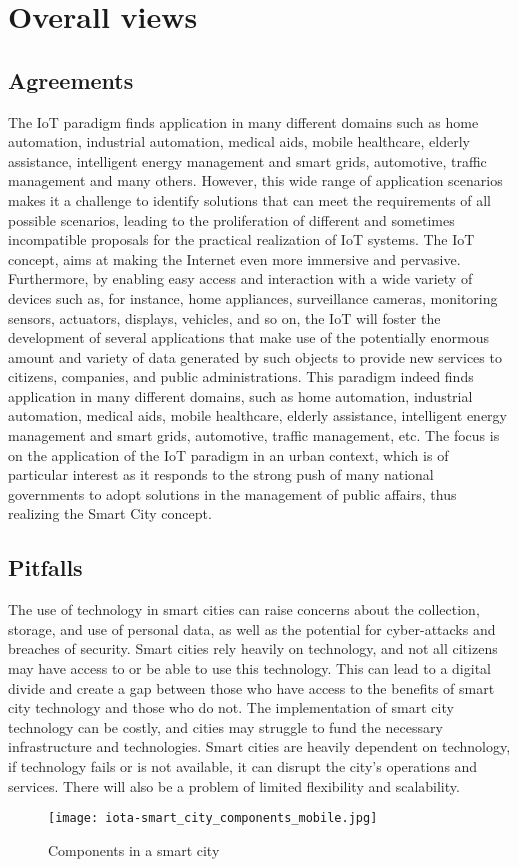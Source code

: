 \documentclass{article}
\begin{document}
 \section{Overall views}
\subsection{Agreements}
The IoT paradigm finds application in many different domains such as home automation, industrial automation, medical aids, mobile healthcare, elderly assistance, intelligent energy management and smart grids, automotive, traffic management and many others. However, this wide range of application scenarios makes it a challenge to identify solutions that can meet the requirements of all possible scenarios, leading to the proliferation of different and sometimes incompatible proposals for the practical realization of IoT systems.
The IoT concept, aims at making the Internet even more immersive and pervasive. Furthermore, by enabling easy access and interaction with a wide variety of devices such as, for instance, home appliances, surveillance cameras, monitoring sensors, actuators, displays, vehicles, and so on, the IoT will foster the development of several applications that make use of the potentially enormous amount and variety of data generated by such objects to provide new services to citizens, companies, and public administrations. This paradigm indeed finds application in many different domains, such as home automation, industrial automation, medical aids, mobile healthcare, elderly assistance, intelligent energy management and smart grids, automotive, traffic management, etc. The focus is on the application of the IoT paradigm in an urban context, which is of particular interest as it responds to the strong push of many national governments to adopt solutions in the management of public affairs, thus realizing the Smart City concept.
\subsection{Pitfalls}
The use of technology in smart cities can raise concerns about the collection, storage, and use of personal data, as well as the potential for cyber-attacks and breaches of security.
Smart cities rely heavily on technology, and not all citizens may have access to or be able to use this technology. This can lead to a digital divide and create a gap between those who have access to the benefits of smart city technology and those who do not.
The implementation of smart city technology can be costly, and cities may struggle to fund the necessary infrastructure and technologies.
Smart cities are heavily dependent on technology, if technology fails or is not available, it can disrupt the city's operations and services. There will also be a problem of limited flexibility and scalability.
\begin{figure}[h]
\centering
\texttt{[image: iota-smart\_city\_components\_mobile.jpg]}
\caption{\label{fig:frog}Components in a smart city}
\end{figure}
\end{document}
